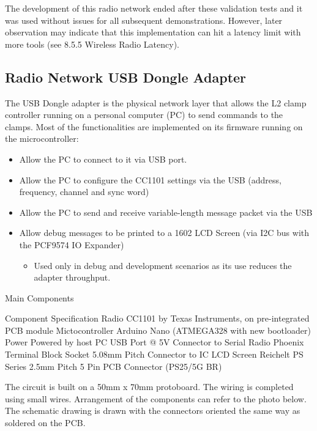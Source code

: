 The development of this radio network ended after these validation tests and it was used without issues for all subsequent demonstrations. However, later observation may indicate that this implementation can hit a latency limit with more tools (see 8.5.5 Wireless Radio Latency).

\subsection{Radio Network USB Dongle Adapter}
The USB Dongle adapter is the physical network layer that allows the L2 clamp controller running on a personal computer (PC) to send commands to the clamps. Most of the functionalities are implemented on its firmware running on the microcontroller:
\begin{itemize}
    \item Allow the PC to connect to it via USB port.
    \item Allow the PC to configure the CC1101 settings via the USB (address, frequency, channel and sync word)
    \item Allow the PC to send and receive variable-length message packet via the USB
    \item Allow debug messages to be printed to a 1602 LCD Screen (via I2C bus with the PCF9574 IO Expander)
    \begin{itemize}
        \item Used only in debug and development scenarios as its use reduces the adapter throughput.
    \end{itemize}
\end{itemize}

Main Components

Component
Specification
Radio
CC1101 by Texas Instruments, on pre-integrated PCB module
Mictocontroller
Arduino Nano (ATMEGA328 with new bootloader)
Power
Powered by host PC USB Port @ 5V
Connector to Serial Radio
Phoenix Terminal Block Socket 5.08mm Pitch
Connector to IC LCD Screen
Reichelt PS Series 2.5mm Pitch 5 Pin PCB Connector (PS25/5G BR)  


The circuit is built on a 50mm x 70mm protoboard. The wiring is completed using small wires. Arrangement of the components can refer to the photo below. The schematic drawing is drawn with the connectors oriented the same way as soldered on the PCB.

